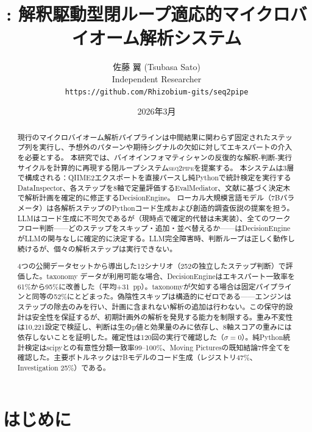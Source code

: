 \documentclass[11pt,a4paper]{article}
\title{\seqpipe: 解釈駆動型閉ループ適応的マイクロバイオーム解析システム}
\author{佐藤 翼 (Tsubasa Sato) \\ Independent Researcher \\
  \texttt{https://github.com/Rhizobium-gits/seq2pipe}}
\date{2026年3月}
\newcommand{\seqpipe}{\textsc{seq2pipe}}
\begin{document}
\maketitle

\begin{abstract}

現行のマイクロバイオーム解析パイプラインは中間結果に関わらず固定されたステップ列を実行し、予想外のパターンや期待シグナルの欠如に対してエキスパートの介入を必要とする。
本研究では、バイオインフォマティシャンの反復的な解釈-判断-実行サイクルを計算的に再現する閉ループシステム\seqpipe を提案する。
本システムは3層で構成される：QIIME2エクスポートを直接パースし純Pythonで統計検定を実行するDataInspector、各ステップを8軸で定量評価するEvalMediator、文献に基づく決定木で解析計画を確定的に修正するDecisionEngine。
ローカル大規模言語モデル（7Bパラメータ）は各解析ステップのPythonコード生成および創造的調査仮説の提案を担う。LLMはコード生成に不可欠であるが（現時点で確定的代替は未実装）、全てのワークフロー判断——どのステップをスキップ・追加・並べ替えるか——はDecisionEngineがLLMの関与なしに確定的に決定する。LLM完全障害時、判断ループは正しく動作し続けるが、個々の解析ステップは実行できない。

4つの公開データセットから導出した12シナリオ（252の独立したステップ判断）で評価した。taxonomy データが利用可能な場合、DecisionEngineはエキスパート一致率を61\%から95\%に改善した（平均+31~pp）。taxonomyが欠如する場合は固定パイプラインと同等の52\%にとどまった。偽陰性スキップは構造的にゼロである——エンジンはステップの除去のみを行い、計画に含まれない解析の追加は行わない。この保守的設計は安全性を保証するが、初期計画外の解析を発見する能力を制限する。重み不変性は10,221設定で検証し、判断は生のp値と効果量のみに依存し、8軸スコアの重みには依存しないことを証明した。確定性は120回の実行で確認した（$\sigma = 0$）。純Python統計検定はscipyとの有意性分類一致率99--100\%、Moving Picturesの既知結論7件全てを確認した。主要ボトルネックは7Bモデルのコード生成（レジストリ47\%、Investigation 25\%）である。

\end{abstract}

\section{はじめに}
\label{sec:intro}
\end{document}
